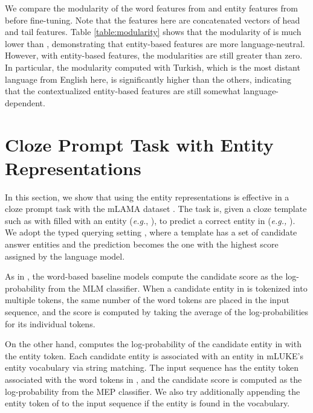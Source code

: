 \documentclass[11pt]{article}
\newcommand{\minisection}[1]{\noindent{\bf {#1}.}}
\begin{document}
We compare the modularity of the word features from \mlukeW{}\ba{} and entity features from \mlukeE{}\ba{} before fine-tuning.
Note that the features here are concatenated vectors of head and tail features.
Table \ref{table:modularity} shows that the modularity of \mlukeE{}\ba{} is much lower than \mlukeW{}\ba{}, demonstrating that entity-based features are more language-neutral.
However, with entity-based features, the modularities are still greater than zero.
In particular, the modularity computed with Turkish, which is the most distant language from English here, is significantly higher than the others, indicating that the contextualized entity-based features are still somewhat language-dependent.


 \section{Cloze Prompt Task with Entity Representations}

In this section, we show that using the entity representations is effective in a cloze prompt task \citep{Liu2021PretrainPA} with the mLAMA dataset \citep{kassner-etal-2021-multilingual}.
The task is, given a cloze template such as  with \X{} filled with an entity ({\it e.g.}, ), to predict a correct entity in \Y{} ({\it e.g.,} ).
We adopt the typed querying setting \citep{kassner-etal-2021-multilingual}, where a template has a set of candidate answer entities and the prediction becomes the one with the highest score assigned by the language model.

\minisection{Model}
As in \citet{kassner-etal-2021-multilingual}, the word-based baseline models compute the candidate score as the log-probability from the MLM classifier.
When a candidate entity in \Y{} is tokenized into multiple tokens, the same number of the word \mask{} tokens are placed in the input sequence, and the score is computed by taking the average of the log-probabilities for its individual tokens.

On the other hand, \mlukeE{} computes the log-probability of the candidate entity in \Y{} with the entity \mask{} token.
Each candidate entity is associated with an entity in mLUKE's entity vocabulary via string matching.
The input sequence has the entity \mask{} token associated with the word \mask{} tokens in \Y{}, and the candidate score is computed as the log-probability from the MEP classifier.
We also try additionally appending the entity token of \X{} to the input sequence if the entity is found in the vocabulary.
\end{document}
